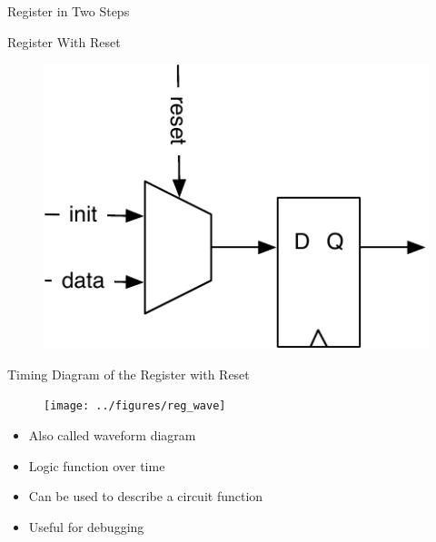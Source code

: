 \begin{frame}[fragile]{Register in Two Steps}
\end{frame}

\begin{frame}[fragile]{Register With Reset}
\begin{figure}
  \includegraphics[scale=\scale]{../figures/register-reset}
\end{figure}
\end{frame}

\begin{frame}[fragile]{Timing Diagram of the Register with Reset}
\begin{figure}
  \texttt{[image: ../figures/reg\_wave]}
\end{figure}
\begin{itemize}
\item Also called waveform diagram
\item Logic function over time
\item Can be used to describe a circuit function
\item Useful for debugging
\end{itemize}
\end{frame}


